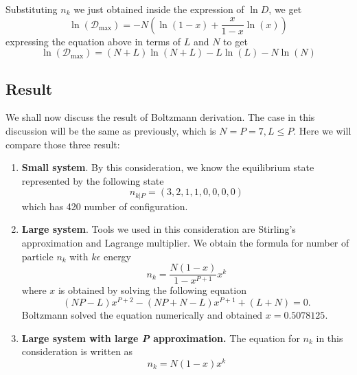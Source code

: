 \documentclass[../../../Main.tex]{subfiles}
\begin{document}
Substituting $n_k$ we just obtained inside the expression of $\ln D$, we get 
\begin{equation*}
    \ln(\mathcal{D}_\text{max})=-N\left(\ln (1-x)+\frac{x}{1-x}\ln (x)\right)
\end{equation*}
expressing the equation above in terms of $L$ and $N$ to get 
\begin{equation*}
    \ln(\mathcal{D}_\text{max})= (N+L)\ln (N+L) - L\ln (L)-N\ln (N)
\end{equation*}

\subsection*{Result}
We shall now discuss the result of Boltzmann derivation. The case in this discussion will be the same as previously, which is $N = P = 7 , L \leq P$. Here we will compare those three result: 
\begin{enumerate}
    \item \textbf{Small system}. By this consideration, we know the equilibrium state represented by the following state \begin{equation*}
        n_{k|P}=(3, 2, 1, 1, 0, 0, 0, 0)
    \end{equation*} which has 420 number of configuration.
    \item \textbf{Large system}. Tools we used in this consideration are Stirling's approximation and Lagrange multiplier. We obtain the formula for number of particle $n_k$ with $k\epsilon$ energy \begin{equation*}
        n_k=\frac{N(1-x)}{1-x^{P+1}}x^k
    \end{equation*}
    where $x$ is obtained by solving the following equation
    \begin{equation*}
        (N P - L)x^{P+2} - (NP + N - L)x^{P+1} + (L + N ) = 0.
    \end{equation*}
    Boltzmann solved the equation numerically and obtained $x=0.5078125$.
    \item \textbf{Large system with large \emph{P} approximation.} The equation for $n_k$ in this consideration is written as \begin{equation*}
        n_k= N (1 - x)x^k 
    \end{equation*}
\end{enumerate}
\end{document}
